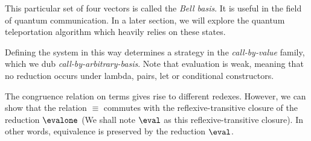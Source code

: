 This particular set of four vectors is called the \textit{Bell basis}. It is useful in the field of quantum communication. In a later section, we will explore the quantum teleportation algorithm which heavily relies on these states. 

Defining the system in this way determines a strategy in the \textit{call-by-value} family, which we dub \textit{call-by-arbitrary-basis}. Note that evaluation is weak, meaning that no reduction occurs under lambda, pairs, let or conditional constructors.

The congruence relation on terms gives rise to different redexes. However, we can show that the relation $\equiv$ commutes with the reflexive-transitive closure of the reduction $\evalone$ (We shall note $\eval$ as this reflexive-transitive closure). In other words, equivalence is preserved by the reduction $\eval$.

